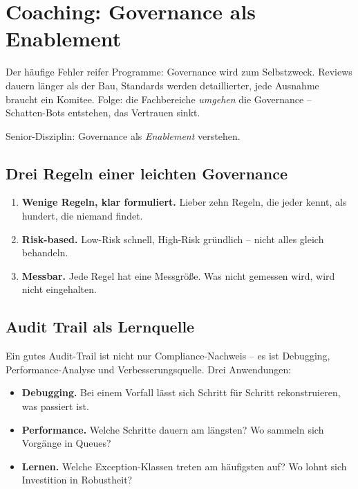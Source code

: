 \documentclass[11pt,a4paper,oneside]{article}
\begin{document}
\section{Coaching: Governance als Enablement}

Der häufige Fehler reifer Programme: Governance wird zum Selbstzweck. Reviews dauern länger als der Bau, Standards werden detaillierter, jede Ausnahme braucht ein Komitee. Folge: die Fachbereiche \emph{umgehen} die Governance -- Schatten-Bots entstehen, das Vertrauen sinkt.

Senior-Disziplin: Governance als \emph{Enablement} verstehen.

\subsection{Drei Regeln einer leichten Governance}

\begin{enumerate}
  \item \textbf{Wenige Regeln, klar formuliert.} Lieber zehn Regeln, die jeder kennt, als hundert, die niemand findet.
  \item \textbf{Risk-based.} Low-Risk schnell, High-Risk gründlich -- nicht alles gleich behandeln.
  \item \textbf{Messbar.} Jede Regel hat eine Messgröße. Was nicht gemessen wird, wird nicht eingehalten.
\end{enumerate}

\subsection{Audit Trail als Lernquelle}

Ein gutes Audit-Trail ist nicht nur Compliance-Nachweis -- es ist Debugging, Performance-Analyse und Verbesserungsquelle. Drei Anwendungen:

\begin{itemize}
  \item \textbf{Debugging.} Bei einem Vorfall lässt sich Schritt für Schritt rekonstruieren, was passiert ist.
  \item \textbf{Performance.} Welche Schritte dauern am längsten? Wo sammeln sich Vorgänge in Queues?
  \item \textbf{Lernen.} Welche Exception-Klassen treten am häufigsten auf? Wo lohnt sich Investition in Robustheit?
\end{itemize}
\end{document}
